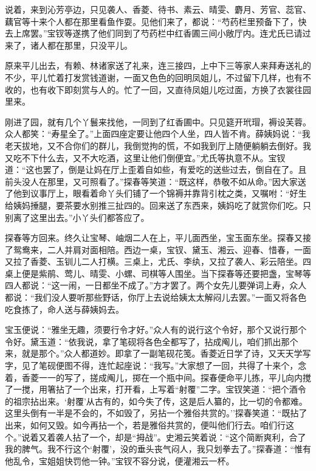 说着，来到沁芳亭边，只见袭人、香菱、待书、素云、晴雯、麝月、芳官、蕊官、藕官等十来个人都在那里看鱼作耍。见他们来了，都说：``芍药栏里预备下了，快去上席罢。''宝钗等遂携了他们同到了芍药栏中红香圃三间小敞厅内。连尤氏已请过来了，诸人都在那里，只没平儿。

原来平儿出去，有赖、林诸家送了礼来，连三接四，上中下三等家人来拜寿送礼的不少，平儿忙着打发赏钱道谢，一面又色色的回明凤姐儿，不过留下几样，也有不收的，也有收下即刻赏与人的。忙了一回，又直待凤姐儿吃过面，方换了衣裳往园里来。

刚进了园，就有几个丫鬟来找他，一同到了红香圃中。只见筵开玳瑁，褥设芙蓉。众人都笑：``寿星全了。''上面四座定要让他四个人坐，四人皆不肯。薛姨妈说：``我老天拔地，又不合你们的群儿，我倒觉拘的慌，不如我到厅上随便躺躺去倒好。我又吃不下什么去，又不大吃酒，这里让他们倒便宜。''尤氏等执意不从。宝钗道：``这也罢了，倒是让妈在厅上歪着自如些，有爱吃的送些过去，倒自在了。且前头没人在那里，又可照看了。''探春等笑道：``既这样，恭敬不如从命。''因大家送了他到议事厅上，眼看着命丫头们铺了一个锦褥并靠背引枕之类，又嘱咐：``好生给姨妈捶腿，要茶要水别推三扯四的。回来送了东西来，姨妈吃了就赏你们吃。只别离了这里出去。''小丫头们都答应了。

探春等方回来。终久让宝琴、岫烟二人在上，平儿面西坐，宝玉面东坐。探春又接了鸳鸯来，二人并肩对面相陪。西边一桌，宝钗、黛玉、湘云、迎春、惜春，一面又拉了香菱、玉钏儿二人打横。三桌上，尤氏、李纨，又拉了袭人、彩云陪坐。四桌上便是紫鹃、莺儿、晴雯、小螺、司棋等人围坐。当下探春等还要把盏，宝琴等四人都说：``这一闹，一日都坐不成了。''方才罢了。两个女先儿要弹词上寿，众人都说：``我们没人要听那些野话，你厅上去说给姨太太解闷儿去罢。''一面又将各色吃食拣了，命人送与薛姨妈去。

宝玉便说：``雅坐无趣，须要行令才好。''众人有的说行这个令好，那个又说行那个令好。黛玉道：``依我说，拿了笔砚将各色全都写了，拈成阄儿，咱们抓出那个来，就是那个。''众人都道妙。即拿了一副笔砚花笺。香菱近日学了诗，又天天学写字，见了笔砚便图不得，连忙起座说：``我写。''大家想了一回，共得了十来个，念着，香菱一一的写了，搓成阄儿，掷在一个瓶中间。探春便命平儿拣，平儿向内搅了一搅，用箸拈了一个出来，打开看，上写着``射覆''二字。宝钗笑道：``把个酒令的祖宗拈出来。`射覆'从古有的，如今失了传，这是后人纂的，比一切的令都难。这里头倒有一半是不会的，不如毁了，另拈一个雅俗共赏的。''探春笑道：``既拈了出来，如何又毁。如今再拈一个，若是雅俗共赏的，便叫他们行去。咱们行这个。''说着又着袭人拈了一个，却是``拇战''。史湘云笑着说：``这个简断爽利，合了我的脾气。我不行这个`射覆'，没的垂头丧气闷人，我只划拳去了。''探春道：``惟有他乱令，宝姐姐快罚他一钟。''宝钗不容分说，便灌湘云一杯。

